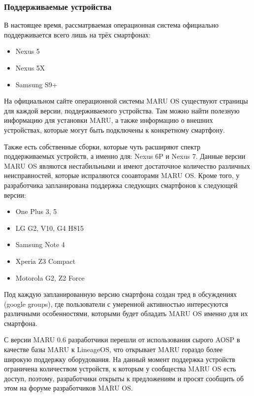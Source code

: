 \documentclass[a4paper, 14pt]{article}
\begin{document}

\subsubsection{Поддерживаемые устройства}

\par В настоящее время, рассматрваемая операционная система официально поддерживается всего лишь на трёх смартфонах:
\begin{itemize}
    \item Nexus 5
    \item Nexus 5X
    \item Samsung S9+
\end{itemize}

\par На официальном сайте операционной системы MARU OS существуют страницы для каждой версии, поддерживаемого устройства. Там можно найти полезную информацию для установки MARU, а также информацию о внешних устройствах, которые могут быть подключены к конкретному смартфону.
\par Также есть собственные сборки, которые чуть расширяют спектр поддерживаемых устройств, а именно для: Nexus 6P и Nexus 7. Данные версии MARU OS являются нестабильными и имеют достаточное количество различных неисправностей, которые испраляются сооавторами MARU OS. Кроме того, у разработчика запланирована поддержка следующих смартфонов к следующей версии: 
\begin{itemize}
    \item One Plus 3, 5
    \item LG G2, V10, G4 H815
    \item Samsung Note 4
    \item Xperia Z3 Compact
    \item Motorola G2, Z2 Force
\end{itemize}
\par Под каждую запланированную версию смартфона создан тред в обсуждениях (google groups), где пользователи с умеренной активностью интересуются различными особенностями, которыми будет обладать MARU OS именно для их смартфона.

\par С версии MARU 0.6 разработчики перешли от использования сырого AOSP в качестве базы MARU к LineageOS, что открывает MARU гораздо более широкую поддержку оборудования. На данный момент поддержка устройств ограничена количеством устройств, к которым у сообщества MARU OS есть доступ, поэтому, разработчики открыты к предложениям и просят сообщить об этом на форуме разработчиков MARU OS.
\end{document}
